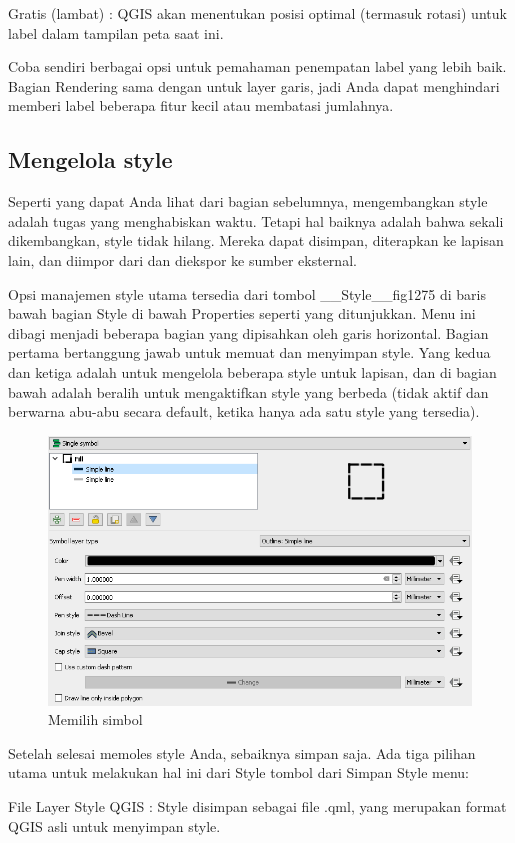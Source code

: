 \documentclass[]{book}
\begin{document}
Gratis (lambat) :
QGIS akan menentukan posisi optimal (termasuk rotasi) untuk label dalam tampilan peta saat ini.

Coba sendiri berbagai opsi untuk pemahaman penempatan label yang lebih baik. Bagian Rendering sama dengan untuk layer garis, jadi Anda dapat menghindari memberi label beberapa fitur kecil atau membatasi jumlahnya.

\hypertarget{mengelola-style}{%
\subsection{Mengelola style}\label{mengelola-style}}

Seperti yang dapat Anda lihat dari bagian sebelumnya, mengembangkan style adalah tugas yang menghabiskan waktu. Tetapi hal baiknya adalah bahwa sekali dikembangkan, style tidak hilang. Mereka dapat disimpan, diterapkan ke lapisan lain, dan diimpor dari dan diekspor ke sumber eksternal.

Opsi manajemen style utama tersedia dari tombol \_\_Style\_\_fig1275 di baris bawah bagian Style di bawah Properties seperti yang ditunjukkan. Menu ini dibagi menjadi beberapa bagian yang dipisahkan oleh garis horizontal. Bagian pertama bertanggung jawab untuk memuat dan menyimpan style. Yang kedua dan ketiga adalah untuk mengelola beberapa style untuk lapisan, dan di bagian bawah adalah beralih untuk mengaktifkan style yang berbeda (tidak aktif dan berwarna abu-abu secara default, ketika hanya ada satu style yang tersedia).

\begin{figure}

{\centering \includegraphics[width=0.3\linewidth]{images/09/fig94} 

}

\caption{Memilih simbol}\label{fig:fig941}
\end{figure}

Setelah selesai memoles style Anda, sebaiknya simpan saja. Ada tiga pilihan utama untuk melakukan hal ini dari Style tombol dari Simpan Style menu:

File Layer Style QGIS : Style disimpan sebagai file .qml, yang merupakan format QGIS asli untuk menyimpan style.
\end{document}
